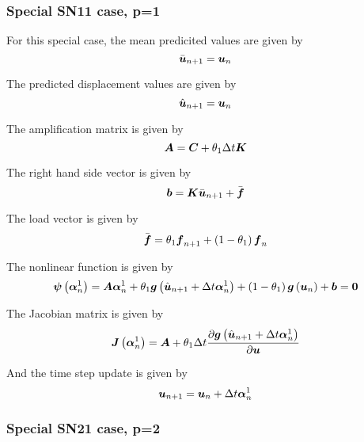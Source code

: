 \subsubsection{Special SN11 case, p=1}

For this special case, the mean predicited values are given by
\begin{equation}
   \bar{ \boldsymbol{u} }_{n+1} =  \boldsymbol{u} _{n}
\end{equation}

The predicted displacement values are given by
\begin{equation}
   \hat{ \boldsymbol{u} }_{n+1} =  \boldsymbol{u} _{n}
\end{equation}

The amplification matrix is given by
\begin{equation}
  \matr{A}=\matr{C}+\theta_{1}\Delta t \matr{K}
\end{equation}

The right hand side vector is given by
\begin{equation}
  \vectr{b}=\matr{K}\bar{\vectr{u}}_{n+1}+\bar{\vectr{f}}
\end{equation}

The load vector is given by
\begin{equation}
  \bar{ \boldsymbol{f} }=\theta_{1} \boldsymbol{f} _{n+1}+\left( 1-\theta_{1} \right) \boldsymbol{f} _{n}
\end{equation}

The nonlinear function is given by
\begin{equation}
  \fnof{\vectr{\psi}}{\vectr{\alpha}^{1}_{n}}=\matr{A}\vectr{\alpha}^{1}_{n}+\theta_{1}\fnof{\vectr{g}}{\hat{\vectr{u}}_{n+1}+ 
    \Delta t\vectr{\alpha}^{1}_{n}}+\pbrac{1-\theta_{1}}\fnof{\vectr{g}}{\vectr{u}_{n}}+\vectr{b}=\vectr{0}
\end{equation}

The Jacobian matrix is given by
\begin{equation}
  \fnof{\matr{J}}{\vectr{\alpha}^{1}_{n}}=\matr{A}+\theta_{1}\Delta t
  \delby{\fnof{\vectr{g}}{\hat{\vectr{u}}_{n+1}+\Delta t\vectr{\alpha}^{1}_{n}}}{\vectr{u}}
\end{equation}

And the time step update is given by
\begin{equation}
     \boldsymbol{u} _{n+1} =  \boldsymbol{u} _{n}+\Delta t \boldsymbol{\alpha} ^{1}_{n}
\end{equation}

\subsubsection{Special SN21 case, p=2}

